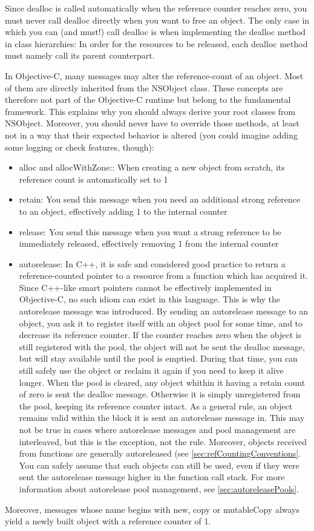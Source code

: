 Since dealloc is called automatically when the reference counter reaches zero, you must never call dealloc directly when you want to free an object. The only case in which you can (and must!) call dealloc is when implementing the dealloc method in class hierarchies: In order for the resources to be released, each dealloc method must namely call its parent counterpart.

In Objective-C, many messages may alter the reference-count of an object. Most of them are directly inherited from the NSObject class. These concepts are therefore not part of the Objective-C runtime but belong to the fundamental framework. This explains why you should always derive your root classes from NSObject. Moreover, you should never have to override those methods, at least not in a way that their expected behavior is altered (you could imagine adding some logging or check features, though):
\begin{itemize}
\item alloc and allocWithZone:: When creating a new object from scratch, its reference count is automatically set to 1
\item retain: You send this message when you need an additional strong reference to an object, effectively adding 1 to the internal counter
\item release: You send this message when you want a strong reference to be immediately released, effectively removing 1 from the internal counter
\item autorelease: In C++, it is safe and considered good practice to return a reference-counted pointer to a resource from a function which has acquired it. Since C++-like smart pointers cannot be effectively implemented in Objective-C, no such idiom can exist in this language. This is why the autorelease message was introduced. By sending an autorelease message to an object, you ask it to register itself with an object pool for some time, and to decrease its reference counter. If the counter reaches zero when the object is still registered with the pool, the object will not be sent the dealloc message, but will stay available until the pool is emptied. During that time, you can still safely use the object or reclaim it again if you need to keep it alive longer. When the pool is cleared, any object whithin it having a retain count of zero is sent the dealloc message. Otherwise it is simply unregistered from the pool, keeping its reference counter intact. As a general rule, an object remains valid within the block it is sent an autorelease message in. This may not be true in cases where autorelease messages and pool management are interleaved, but this is the exception, not the rule. Moreover, objects received from functions are generally autoreleased (see \ref{sec:refCountingConventions}. You can safely assume that such objects can still be used, even if they were sent the autorelease message higher in the function call stack. For more information about autorelease pool management, see \ref{sec:autoreleasePools}.
\end{itemize}
Moreover, messages whose name begins with new, copy or mutableCopy always yield a newly built object with a reference counter of 1.

